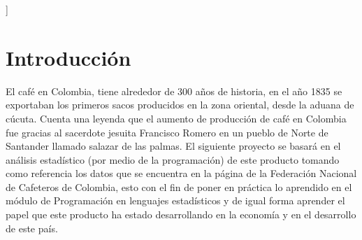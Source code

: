 \documentclass[11pt,letterpaper,twocolumn]{article}
\begin{document}
]
\section{Introducción}
\justify
El café en Colombia, tiene alrededor de 300 años de historia, en el
año 1835 se exportaban los primeros sacos producidos en la zona
oriental, desde la aduana de cúcuta. Cuenta una leyenda que el
aumento de producción de café en Colombia fue gracias al sacerdote
jesuita Francisco Romero en un pueblo de Norte de Santander llamado
salazar de las palmas. El siguiente proyecto se basará en el
análisis estadístico (por medio de la programación) de este producto
tomando como referencia los datos que se encuentra en la página de la Federación Nacional de Cafeteros de Colombia, esto con el fin de poner en práctica lo aprendido en el módulo de Programación en lenguajes estadísticos y de igual forma aprender el papel que este producto ha estado desarrollando en la economía y en el desarrollo de este país. 
\end{document}
